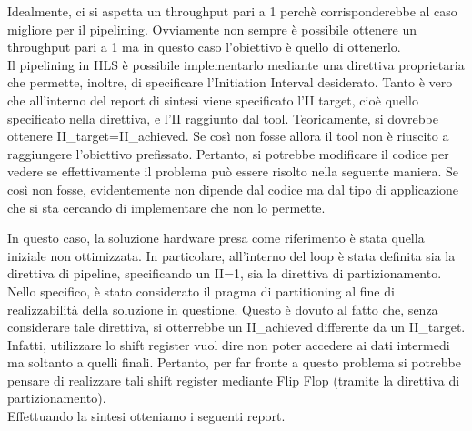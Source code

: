 Idealmente, ci si aspetta un throughput pari a 1 perchè corrisponderebbe al caso migliore per il pipelining. Ovviamente non sempre è possibile ottenere un throughput pari a 1 ma in questo caso l'obiettivo è quello di ottenerlo.
\\
Il pipelining in HLS è possibile implementarlo mediante una direttiva proprietaria che permette, inoltre, di specificare l'Initiation Interval desiderato. Tanto è vero che all'interno del report di sintesi viene specificato l'II target, cioè quello specificato nella direttiva, e l'II raggiunto dal tool. Teoricamente, si dovrebbe ottenere II\_target=II\_achieved. Se così non fosse allora il tool non è riuscito a raggiungere l'obiettivo prefissato. Pertanto, si potrebbe modificare il codice per vedere se effettivamente il problema può essere risolto nella seguente maniera. Se così non fosse, evidentemente non dipende dal codice ma dal tipo di applicazione che si sta cercando di implementare che non lo permette.



In questo caso, la soluzione hardware presa come riferimento è stata quella iniziale non ottimizzata. In particolare, all'interno del loop è stata definita sia la direttiva di pipeline, specificando un II=1, sia la direttiva di partizionamento. Nello specifico, è stato considerato il pragma di partitioning al fine di realizzabilità della soluzione in questione. Questo è dovuto al fatto che, senza considerare tale direttiva, si otterrebbe un II\_achieved differente da un II\_target. Infatti, utilizzare lo shift register vuol dire non poter accedere ai dati intermedi ma soltanto a quelli finali. Pertanto, per far fronte a questo problema si potrebbe pensare di realizzare tali shift register mediante Flip Flop (tramite la direttiva di partizionamento).
\\
Effettuando la sintesi otteniamo i seguenti report.

